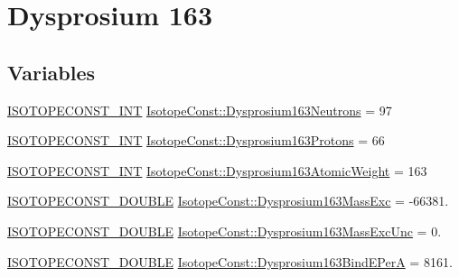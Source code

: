 \hypertarget{group___isotope_const-_dysprosium-_dy163}{}\section{Dysprosium 163}
\label{group___isotope_const-_dysprosium-_dy163}
\subsection*{Variables}
\begin{DoxyCompactItemize}
\item 
\mbox{\hyperlink{group___isotope_const-_macros_ga5f18360b3e99483a35c32d789e62621c}{I\+S\+O\+T\+O\+P\+E\+C\+O\+N\+S\+T\+\_\+\+I\+NT}} \mbox{\hyperlink{group___isotope_const-_dysprosium-_dy163_ga35ff0ac94f3ffc00e1fb213763280652}{Isotope\+Const\+::\+Dysprosium163\+Neutrons}} = 97
\item 
\mbox{\hyperlink{group___isotope_const-_macros_ga5f18360b3e99483a35c32d789e62621c}{I\+S\+O\+T\+O\+P\+E\+C\+O\+N\+S\+T\+\_\+\+I\+NT}} \mbox{\hyperlink{group___isotope_const-_dysprosium-_dy163_gac00d7b34c54d360570c14f4c178000b0}{Isotope\+Const\+::\+Dysprosium163\+Protons}} = 66
\item 
\mbox{\hyperlink{group___isotope_const-_macros_ga5f18360b3e99483a35c32d789e62621c}{I\+S\+O\+T\+O\+P\+E\+C\+O\+N\+S\+T\+\_\+\+I\+NT}} \mbox{\hyperlink{group___isotope_const-_dysprosium-_dy163_ga9164de59e6faafad674cd11a22b74e63}{Isotope\+Const\+::\+Dysprosium163\+Atomic\+Weight}} = 163
\item 
\mbox{\hyperlink{group___isotope_const-_macros_ga8f45a7272ce02c0b4c65c44636ed719a}{I\+S\+O\+T\+O\+P\+E\+C\+O\+N\+S\+T\+\_\+\+D\+O\+U\+B\+LE}} \mbox{\hyperlink{group___isotope_const-_dysprosium-_dy163_gae87152d66d2ab85ec69774c7cd0b8a50}{Isotope\+Const\+::\+Dysprosium163\+Mass\+Exc}} = -\/66381.
\item 
\mbox{\hyperlink{group___isotope_const-_macros_ga8f45a7272ce02c0b4c65c44636ed719a}{I\+S\+O\+T\+O\+P\+E\+C\+O\+N\+S\+T\+\_\+\+D\+O\+U\+B\+LE}} \mbox{\hyperlink{group___isotope_const-_dysprosium-_dy163_ga4f32e2e5c3070d7a6d3a544779773b67}{Isotope\+Const\+::\+Dysprosium163\+Mass\+Exc\+Unc}} = 0.
\item 
\mbox{\hyperlink{group___isotope_const-_macros_ga8f45a7272ce02c0b4c65c44636ed719a}{I\+S\+O\+T\+O\+P\+E\+C\+O\+N\+S\+T\+\_\+\+D\+O\+U\+B\+LE}} \mbox{\hyperlink{group___isotope_const-_dysprosium-_dy163_ga4a0689f8d0c6bb6cd93837a7293d6f70}{Isotope\+Const\+::\+Dysprosium163\+Bind\+E\+PerA}} = 8161.
\item 

\end{DoxyCompactItemize}
